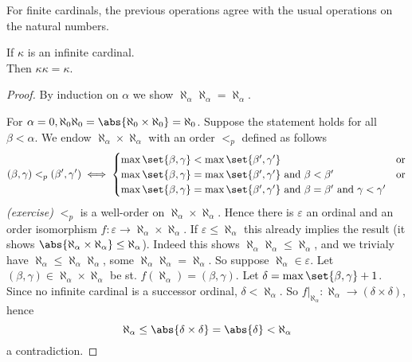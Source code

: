 \begin{remark}
    For finite cardinals, the previous operations agree with the usual operations on the natural numbers.
\end{remark}

\begin{proposition}
    
\end{proposition}

\begin{theorem}[Hessenberg]
    If $\kappa$ is an infinite cardinal.\\
    Then $\kappa\kappa = \kappa$.
\end{theorem}
\begin{proof}
    By induction on $\alpha$ we show $\aleph_\alpha \aleph_\alpha = \aleph_\alpha$.

    For $\alpha =0, \aleph_0 \aleph_0 = \abs{\aleph_0 \times \aleph_0} = \aleph_0$. Suppose the statement holds for all $\beta < \alpha$.
    We endow $\aleph_\alpha \times \aleph_\alpha$ with an order $<_p$ defined as follows
    $$ (\beta, \gamma) <_p (\beta', \gamma') \iff \begin{cases}
        \max \set{\beta, \gamma} < \max \set{\beta', \gamma'}& \text{or}\\
        \max \set{\beta, \gamma} = \max \set{\beta', \gamma'} \text{ and } \beta < \beta' & \text{or}\\
        \max \set{\beta, \gamma} = \max \set{\beta', \gamma'} \text{ and } \beta = \beta' \text{ and } \gamma < \gamma'
    \end{cases}$$
    \emph{(exercise)} $<_p$ is a well-order on $\aleph_\alpha \times \aleph_\alpha$. Hence there is $\varepsilon$ an ordinal
    and an order isomorphism $f: \varepsilon \to \aleph_\alpha \times \aleph_\alpha$. If $\varepsilon \leq \aleph_\alpha$ this
    already implies the result (it shows $\abs{\aleph_\alpha \times \aleph_\alpha} \leq \aleph_\alpha$). Indeed this shows 
    $\aleph_\alpha \aleph_\alpha \leq \aleph_\alpha$, and we trivialy have $\aleph_\alpha \leq \aleph_\alpha \aleph_\alpha$, some
    $\aleph_\alpha \aleph_\alpha = \aleph_\alpha$.
    So suppose $\aleph_\alpha \in \varepsilon$. Let $(\beta, \gamma) \in \aleph_\alpha \times \aleph_\alpha$ be st. 
    $f(\aleph_\alpha) = (\beta, \gamma)$. Let $\delta = \max \set{\beta, \gamma} + 1$. Since no infinite cardinal is a successor
    ordinal, $\delta < \aleph_\alpha$. So $ f|_{\aleph_\alpha} : \aleph_\alpha \to (\delta \times \delta)$, hence
    $$ \aleph_\alpha \leq \abs{\delta \times \delta} = \abs{\delta} < \aleph_\alpha$$ a contradiction. 
\end{proof}
